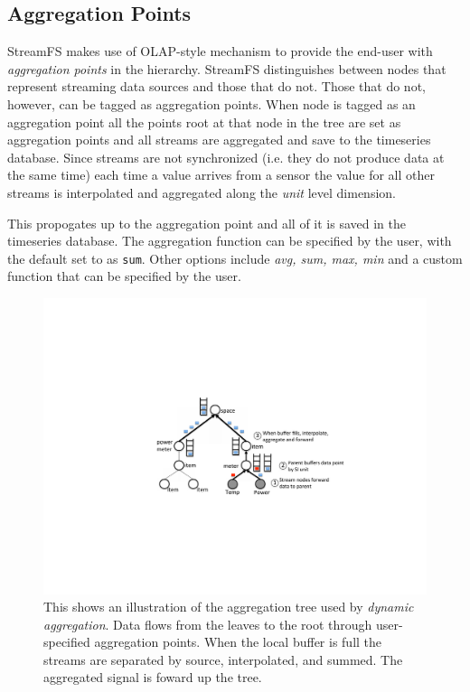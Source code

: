 \subsection{Aggregation Points}
\label{sec:aggpts}
StreamFS makes use of OLAP-style mechanism to provide the end-user with \emph{aggregation points} in the hierarchy.
StreamFS distinguishes between nodes that represent streaming data sources and those that do not.  Those that do not, 
however, can be tagged as aggregation points.  
When node is tagged as an aggregation point all the points root at that
node in the tree are set as aggregation points and all streams are aggregated and save to the timeseries database.
Since streams are not synchronized (i.e. they do not produce data at the same time) each time a value arrives from a
sensor the value for all other streams is interpolated and aggregated along the \emph{unit} level dimension.

This propogates up to the aggregation point and all of it is saved in the timeseries database.  The aggregation function
can be specified by the user, with the default set to as \texttt{sum}.  Other options include \emph{avg, sum, max, min} and
a custom function that can be specified by the user. %

\begin{figure}[htb!]
\begin{center}
\includegraphics[scale=0.6]{figs/aggtree}
\caption{This shows an illustration of the aggregation tree used by \emph{dynamic aggregation}.  Data flows from 
the leaves to the root through user-specified aggregation points.  When the local buffer is full the streams
are separated by source, interpolated, and summed.  The aggregated signal is foward up the tree.}
\label{fig:aggtree}
\end{center}
\end{figure}

